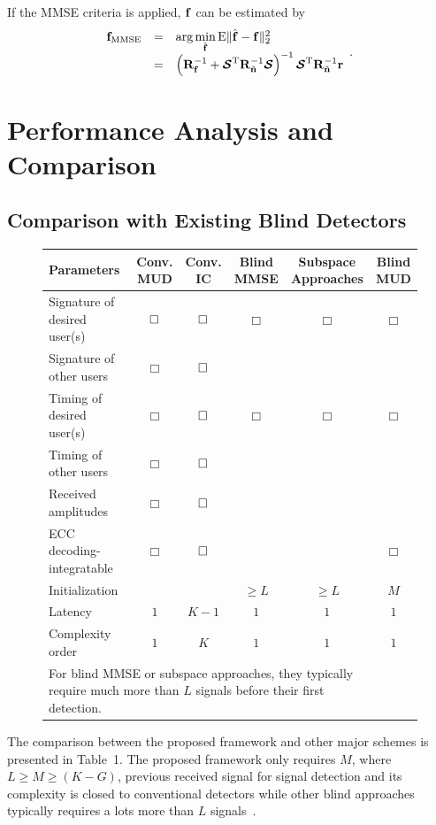 \documentclass[conference]{IEEEtran}
\newcommand{\br}{{\mathbf r}}
\newcommand{\bn}{{\bf n}}
\newcommand{\bbf}{{\bf f}}
\newcommand{\bR}{{\bf R}}
\newcommand{\bcS}{{\mbox {\boldmath ${\cal S}$}}}
\begin{document}
If the MMSE criteria is applied, $\bbf$ can be estimated by
\begin{equation}\hspace{-0.07in}
\begin{array}{rcl}
{\bbf}_{\rm MMSE}&=&\mbox{arg}\min\limits_{\hat{\bbf}}\mbox{E}\|\hat{\bbf}-\bbf\|_2^2\\
&=&\left(\bR_{\bbf}^{-1}+\bcS^{\rm
T}\bR_{\tilde{\bn}}^{-1}\bcS\right)^{-1}\bcS^{\rm
T}\bR_{\tilde{\bn}}^{-1}\br
\end{array}. \label{MSE}
\end{equation}

\section{Performance Analysis and Comparison}

\subsection{Comparison with Existing Blind Detectors}
\begin{figure}[t]\label{SchemComp}\small
{}
\begin{center}
\begin{tabular}{lccccc}
Parameters & Conv. MUD & Conv. IC &Blind MMSE & Subspace Approaches & Blind MUD\\
\hline \hline
Signature of desired user(s) & $\bf\Box$ & $\bf\Box$ & $\mathbf\Box$ &  $\mathbf\Box$ & $\mathbf\Box$ \\
Signature of other users & $\mathbf\Box$ & $\bf\Box$ & & &  \\
Timing of desired user(s)  & $\mathbf\Box$ & $\bf\Box$ & $\mathbf\Box$ & $\mathbf\Box$ & $\mathbf\Box$ \\
Timing of other users  & $\mathbf\Box$ & $\bf\Box$ & & & \\
Received amplitudes  & $\mathbf\Box$ & $\bf\Box$ & &  &\\
ECC decoding-integratable& $\mathbf\Box$ &$\bf\Box$ & && $\mathbf\Box$ \\
Initialization~{\small *} &  & & $\ge L$ & $\ge L$ & $M$\\
Latency & $1$ & $K-1$& $1$ & $1$ & $1$ \\
Complexity order & $1$ & $K$ & $1$ & $1$ & $1$ \\
\hline \hline \multicolumn{5}{l}{\tiny * For blind MMSE or
subspace approaches, they typically require much more than $L$
signals before their first detection.}
\end{tabular}
\end{center}
\end{figure}
The comparison between the proposed framework and other major
schemes is presented in Table~1. The proposed framework only
requires $M$, where $L\ge M\ge (K-G)$, previous received signal
for signal detection and its complexity is closed to conventional
detectors while other blind approaches typically requires a lots
more than $L$ signals~\cite{Madh94,Wang98,Zhang02}.
\end{document}
